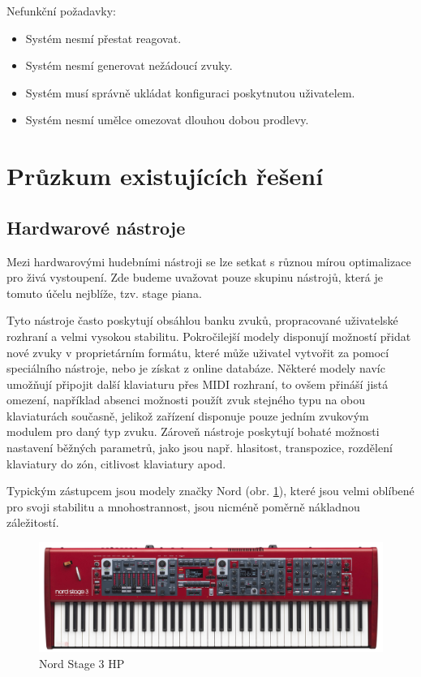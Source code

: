 \documentclass[thesis=M,czech]{FITthesis}[2019/03/06]
\begin{document}
		Nefunkční požadavky:
		\begin{itemize}
			\item Systém nesmí přestat reagovat.
			\item Systém nesmí generovat nežádoucí zvuky.
			\item Systém musí správně ukládat konfiguraci poskytnutou uživatelem.
			\item Systém nesmí umělce omezovat dlouhou dobou prodlevy.
		\end{itemize}
		
	\section{Průzkum existujících řešení}
		\subsection{Hardwarové nástroje}
			Mezi hardwarovými hudebními nástroji se lze setkat s různou mírou optimalizace pro živá vystoupení.
			Zde budeme uvažovat pouze skupinu nástrojů, která je tomuto účelu nejblíže, tzv. stage piana.
			
			Tyto nástroje často poskytují obsáhlou banku zvuků, propracované uživatelské rozhraní a velmi vysokou stabilitu.
			Pokročilejší modely disponují možností přidat nové zvuky v proprietárním formátu, které může uživatel vytvořit za pomocí speciálního nástroje,
			nebo je získat z online databáze. Některé modely navíc umožňují připojit další klaviaturu přes MIDI rozhraní, to ovšem přináší jistá omezení,
			například absenci možnosti použít zvuk stejného typu na obou klaviaturách současně, jelikož zařízení disponuje pouze jedním zvukovým modulem
			pro daný typ zvuku.
			Zároveň nástroje poskytují bohaté možnosti nastavení běžných parametrů, jako jsou např. hlasitost, transpozice, rozdělení klaviatury do zón,
			citlivost klaviatury apod.
			
			Typickým zástupcem jsou modely značky Nord (obr. \ref{fig:HardwareStagepiano}), které jsou velmi oblíbené pro svoji stabilitu a mnohostrannost, jsou nicméně poměrně nákladnou záležitostí.
			
			\begin{figure}[H]
				\centering
				\includegraphics[width=1\textwidth]{HardwareStagepiano}
				\caption[Nord Stage 3 HP]{Nord Stage 3 HP}\label{fig:HardwareStagepiano}
			\end{figure}
\end{document}
